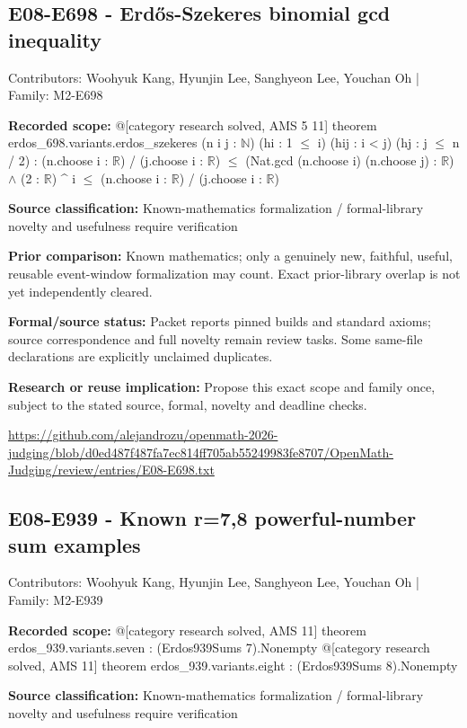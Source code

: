 \documentclass[11pt,a4paper]{article}
\begin{document}
\begin{samepage}
\subsection{E08-E698  -  Erdős-Szekeres binomial gcd inequality}
{\small Contributors: Woohyuk Kang, Hyunjin Lee, Sanghyeon Lee, Youchan Oh | Family: M2-E698\par}

\textbf{Recorded scope:} @[category research solved, AMS 5 11] theorem erdos\_698.variants.erdos\_szekeres (n i j : \ensuremath{\mathbb{N}}) (hi : 1 \ensuremath{\leq} i) (hij : i < j) (hj : j \ensuremath{\leq} n / 2) : (n.choose i : \ensuremath{\mathbb{R}}) / (j.choose i : \ensuremath{\mathbb{R}}) \ensuremath{\leq} (Nat.gcd (n.choose i) (n.choose j) : \ensuremath{\mathbb{R}}) \ensuremath{\wedge} (2 : \ensuremath{\mathbb{R}}) \textasciicircum{} i \ensuremath{\leq} (n.choose i : \ensuremath{\mathbb{R}}) / (j.choose i : \ensuremath{\mathbb{R}})


\end{samepage}
\textbf{Source classification:} Known-mathematics formalization / formal-library novelty and usefulness require verification

\textbf{Prior comparison:} Known mathematics; only a genuinely new, faithful, useful, reusable event-window formalization may count. Exact prior-library overlap is not yet independently cleared.

\textbf{Formal/source status:} Packet reports pinned builds and standard axioms; source correspondence and full novelty remain review tasks. Some same-file declarations are explicitly unclaimed duplicates.

\textbf{Research or reuse implication:} Propose this exact scope and family once, subject to the stated source, formal, novelty and deadline checks.

{\small \url{https://github.com/alejandrozu/openmath-2026-judging/blob/d0ed487f487fa7ec814ff705ab55249983fe8707/OpenMath-Judging/review/entries/E08-E698.txt}\par}

\begin{samepage}
\subsection{E08-E939  -  Known r=7,8 powerful-number sum examples}
{\small Contributors: Woohyuk Kang, Hyunjin Lee, Sanghyeon Lee, Youchan Oh | Family: M2-E939\par}

\textbf{Recorded scope:} @[category research solved, AMS 11] theorem erdos\_939.variants.seven : (Erdos939Sums 7).Nonempty
@[category research solved, AMS 11] theorem erdos\_939.variants.eight : (Erdos939Sums 8).Nonempty


\end{samepage}
\textbf{Source classification:} Known-mathematics formalization / formal-library novelty and usefulness require verification
\end{document}
